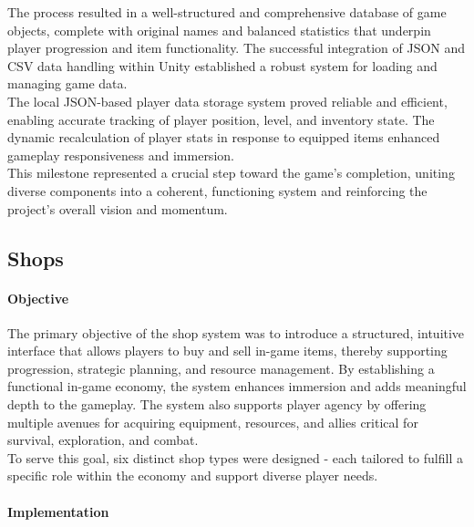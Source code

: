 \documentclass{article}
\begin{document}
The process resulted in a well-structured and comprehensive database of game objects, complete with original names and balanced statistics that underpin player progression and item functionality. The successful integration of JSON and CSV data handling within Unity established a robust system for loading and managing game data.\\

The local JSON-based player data storage system proved reliable and efficient, enabling accurate tracking of player position, level, and inventory state. The dynamic recalculation of player stats in response to equipped items enhanced gameplay responsiveness and immersion.\\

This milestone represented a crucial step toward the game's completion, uniting diverse components into a coherent, functioning system and reinforcing the project's overall vision and momentum.










\newpage
\subsection{Shops}
\paragraph{Objective}\hfill

The primary objective of the shop system was to introduce a structured, intuitive interface that allows players to buy and sell in-game items, thereby supporting progression, strategic planning, and resource management. By establishing a functional in-game economy, the system enhances immersion and adds meaningful depth to the gameplay. The system also supports player agency by offering multiple avenues for acquiring equipment, resources, and allies critical for survival, exploration, and combat.\\

To serve this goal, six distinct shop types were designed - each tailored to fulfill a specific role within the economy and support diverse player needs.

\paragraph{Implementation}\hfill
\end{document}
